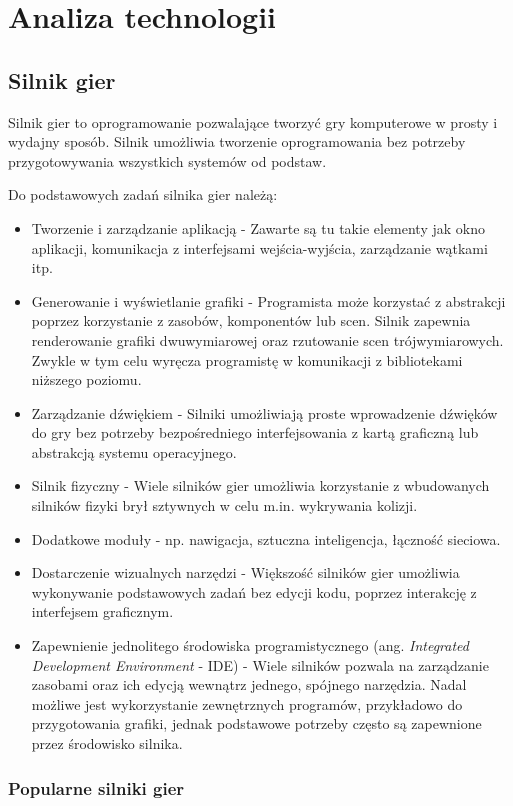 \chapter{Analiza technologii}
\section{Silnik gier}
Silnik gier to oprogramowanie pozwalające tworzyć gry komputerowe w prosty i wydajny sposób. Silnik umożliwia tworzenie oprogramowania bez potrzeby przygotowywania wszystkich systemów od podstaw. 

Do podstawowych zadań silnika gier należą:
\begin{itemize}
    \item Tworzenie i zarządzanie aplikacją - Zawarte są tu takie elementy jak okno aplikacji, komunikacja z interfejsami wejścia-wyjścia, zarządzanie wątkami itp.
    \item Generowanie i wyświetlanie grafiki - Programista może korzystać z abstrakcji poprzez korzystanie z zasobów, komponentów lub scen. Silnik zapewnia renderowanie grafiki dwuwymiarowej oraz rzutowanie scen trójwymiarowych. Zwykle w tym celu wyręcza programistę w komunikacji z bibliotekami niższego poziomu. 
    \item Zarządzanie dźwiękiem - Silniki umożliwiają proste wprowadzenie dźwięków do gry bez potrzeby bezpośredniego interfejsowania z kartą graficzną lub abstrakcją systemu operacyjnego.
    \item Silnik fizyczny - Wiele silników gier umożliwia korzystanie z wbudowanych silników fizyki brył sztywnych w celu m.in. wykrywania kolizji.
    \item Dodatkowe moduły - np. nawigacja, sztuczna inteligencja, łączność sieciowa.

    \item Dostarczenie wizualnych narzędzi - Większość silników gier umożliwia wykonywanie podstawowych zadań bez edycji kodu, poprzez interakcję z interfejsem graficznym. 
    \item Zapewnienie jednolitego środowiska programistycznego (ang. \emph{Integrated Development Environment} - IDE) - Wiele silników pozwala na zarządzanie zasobami oraz ich edycją wewnątrz jednego, spójnego narzędzia. Nadal możliwe jest wykorzystanie zewnętrznych programów, przykładowo do przygotowania grafiki, jednak podstawowe potrzeby często są zapewnione przez środowisko silnika.
\end{itemize}

\subsection{Popularne silniki gier}

